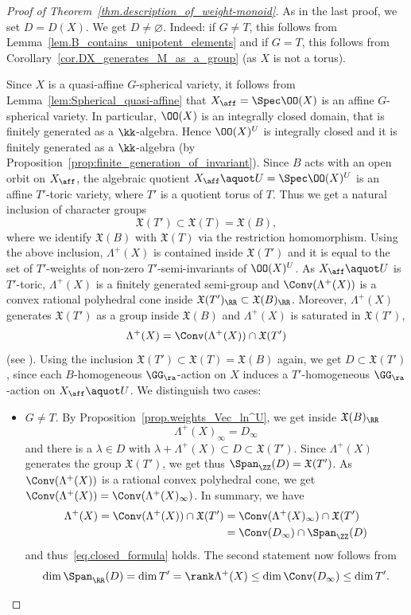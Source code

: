 \begin{proof}[Proof of Theorem~\ref{thm.description_of_weight-monoid}]
As in the last proof, we set $D = D(X)$. We get $D \neq \varnothing$. Indeed: if $G \neq T$, this follows
from Lemma~\ref{lem.B_contains_unipotent_elements} and if $G = T$, this follows from Corollary~\ref{cor.DX_generates_M_as_a_group} (as $X$ is not a torus).

Since $X$ is a quasi-affine $G$-spherical variety, it follows from Lemma~\ref{lem:Spherical_quasi-affine}
that $X_{\aff} = \Spec \OO(X)$ is an affine $G$-spherical variety.
In particular, $\OO(X)$ is an integrally closed domain, that is finitely generated as a $\kk$-algebra.
Hence $\OO(X)^U$ is integrally closed and
it is finitely generated as a $\kk$-algebra (by Proposition~\ref{prop:finite_generation_of_invariant}).
Since $B$ acts with an open orbit on $X_{\aff}$, the algebraic quotient
$X_{\aff} \aquot U = \Spec \OO(X)^U$ is an affine $T'$-toric variety, where $T'$ is a quotient torus
of $T$. Thus we get a natural inclusion of character groups
\[
\mathfrak{X}(T') \subset \mathfrak{X}(T) = \mathfrak{X}(B),
\]
where we identify $\mathfrak{X}(B)$ with $\mathfrak{X}(T)$ via the restriction homomorphism.
Using the above inclusion, $\Lambda^+(X)$ is contained
inside $\mathfrak{X}(T')$ and it is equal to the set of $T'$-weights of non-zero $T'$-semi-invariants
of $\OO(X)^U$. As $X_{\aff} \aquot U$ is $T'$-toric, $\Lambda^+(X)$ is a finitely generated semi-group and $\Conv(\Lambda^+(X))$
is a convex rational polyhedral cone inside $\mathfrak{X}(T')_{\RR} \subset \mathfrak{X}(B)_{\RR}$.
Moreover, $\Lambda^+(X)$ generates $\mathfrak{X}(T')$ as a group inside $\mathfrak{X}(B)$ and
$\Lambda^+(X)$ is saturated in $\mathfrak{X}(T')$, \ie
\[
\Lambda^+(X) = \Conv(\Lambda^+(X)) \cap \mathfrak{X}(T')
\]
(see \cite[Ex.\,1.3.4\,(a)]{CoLiSc2011Toric-varieties}). Using the inclusion
$\mathfrak{X}(T') \subset \mathfrak{X}(T) = \mathfrak{X}(B)$ again, we get $D \subset \mathfrak{X}(T')$, since each
$B$-homogeneous $\GG_\ra$-action on $X$ induces a $T'$-homogeneous $\GG_\ra$-action on
$X_{\aff} \aquot U$. We distinguish two cases:

\begin{itemize}
\item $G \neq T$. By Proposition~\ref{prop.weights_Vec_ln^U}, we get inside $\mathfrak{X}(B)_{\RR}$
\[
\Lambda^+(X)_{\infty} = D_{\infty}
\]
and there is a $\lambda \in D$ with $\lambda + \Lambda^+(X) \subset D \subset \mathfrak{X}(T')$.
Since $\Lambda^+(X)$ generates the group $\mathfrak{X}(T')$, we get thus $\Span_{\ZZ}(D) = \mathfrak{X}(T')$.
As $\Conv(\Lambda^+(X))$ is a rational convex polyhedral cone, we get
$\Conv(\Lambda^+(X)) = \Conv(\Lambda^+(X)_{\infty})$.
In summary, we have
\begin{align*}
\Lambda^+(X) = \Conv(\Lambda^+(X)) \cap \mathfrak{X}(T')
&= \Conv(\Lambda^+(X)_\infty) \cap \mathfrak{X}(T') \\
&= \Conv ( D_{\infty}) \cap \Span_{\ZZ}(D)
\end{align*}
and thus~\eqref{eq.closed_formula} holds. The second statement now follows from
\[
\dim \Span_{\RR}(D) = \dim T' = \rank \Lambda^+(X) \leq
\dim \Conv(D_\infty) \leq \dim T'.
\]


\end{itemize}
\end{proof}
